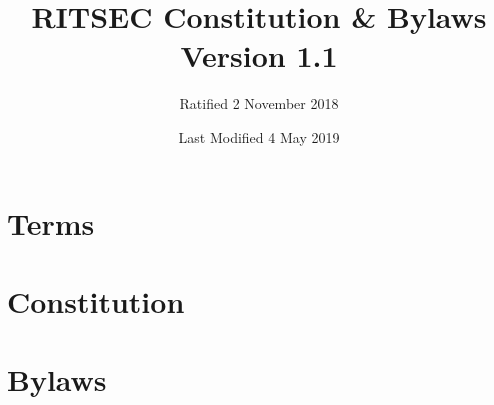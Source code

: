 \documentclass{constitution}
\title{RITSEC Constitution \& Bylaws\\ Version 1.1}
\author{Ratified 2 November 2018}
\date{Last Modified 4 May 2019}
\begin{document}
\maketitle
\newpage

\part{Terms}



\newpage

\part{Constitution}












\newpage


\part{Bylaws}




\end{document}
